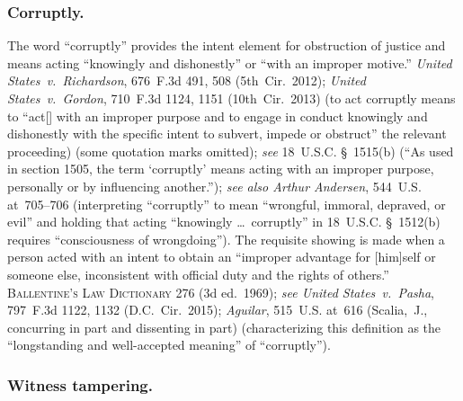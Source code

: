 \subsubsection*{Corruptly.}

The word ``corruptly'' provides the intent element for obstruction of justice and means acting ``knowingly and dishonestly'' or ``with an improper motive.''
\textit{United States~v.\ Richardson}, 676~F.3d 491, 508 (5th~Cir.~2012);
\textit{United States~v.\ Gordon}, 710~F.3d 1124, 1151 (10th~Cir.~2013) (to act corruptly means to ``act[] with an improper purpose and to engage in conduct knowingly and dishonestly with the specific intent to subvert, impede or obstruct'' the relevant proceeding) (some quotation marks omitted);
\textit{see} 18~U.S.C. \S~1515(b) (``As used in section 1505, the term `corruptly' means acting with an improper purpose, personally or by influencing another.'');
\textit{see also Arthur Andersen}, 544~U.S. at~705--706 (interpreting ``corruptly'' to mean ``wrongful, immoral, depraved, or evil'' and holding that acting ``knowingly \dots\ corruptly'' in 18~U.S.C. \S~1512(b) requires ``consciousness of wrongdoing'').
The requisite showing is made when a person acted with an intent to obtain an ``improper advantage for [him]self or someone else, inconsistent with official duty and the rights of others.''
\textsc{Ballentine's Law Dictionary} 276 (3d ed.~1969);
\textit{see United States~v.\ Pasha}, 797~F.3d 1122, 1132 (D.C.~Cir.~2015);
\textit{Aguilar}, 515~U.S. at~616 (Scalia,~J., concurring in part and dissenting in part) (characterizing this definition as the ``longstanding and well-accepted meaning'' of ``corruptly'').

\subsubsection*{Witness tampering.}


